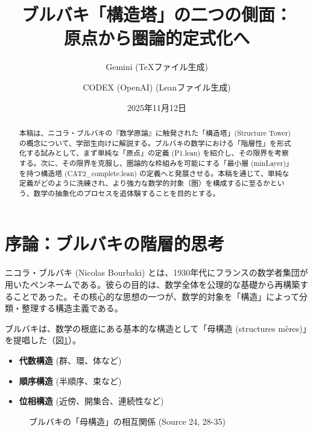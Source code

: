 \documentclass[11pt]{ltjsarticle}
\title{ブルバキ「構造塔」の二つの側面：\\
原点から圏論的定式化へ}
\author{
    Gemini (TeXファイル生成) \and
    CODEX (OpenAI) (Leanファイル生成)
}
\date{2025年11月12日}
\theoremstyle{definition}
\theoremstyle{plain}
\theoremstyle{remark}
\begin{document}
\maketitle

\begin{abstract}
本稿は、ニコラ・ブルバキの『数学原論』に触発された「構造塔」(Structure Tower)の概念について、学部生向けに解説する。ブルバキの数学における「階層性」を形式化する試みとして、まず単純な「原点」の定義 (P1.lean) を紹介し、その限界を考察する。次に、その限界を克服し、圏論的な枠組みを可能にする「最小層 (minLayer)」を持つ構造塔 (CAT2\_complete.lean) の定義へと発展させる。本稿を通じて、単純な定義がどのように洗練され、より強力な数学的対象（圏）を構成するに至るかという、数学の抽象化のプロセスを追体験することを目的とする。
\end{abstract}

\tableofcontents

\section{序論：ブルバキの階層的思考}

ニコラ・ブルバキ (Nicolas Bourbaki) とは、1930年代にフランスの数学者集団が用いたペンネームである。彼らの目的は、数学全体を公理的な基礎から再構築することであった。その核心的な思想の一つが、数学的対象を「構造」によって分類・整理する構造主義である。

ブルバキは、数学の根底にある基本的な構造として「母構造 (structures mères)」を提唱した（図\ref{fig:mother_structures}）。

\begin{itemize}
    \item \textbf{代数構造} (群、環、体など)
    \item \textbf{順序構造} (半順序、束など)
    \item \textbf{位相構造} (近傍、開集合、連続性など)
\end{itemize}

\begin{figure}[hbt]
    \centering
    \caption{ブルバキの「母構造」の相互関係 (Source 24, 28-35)}
    \label{fig:mother_structures}
\end{figure}
\end{document}
